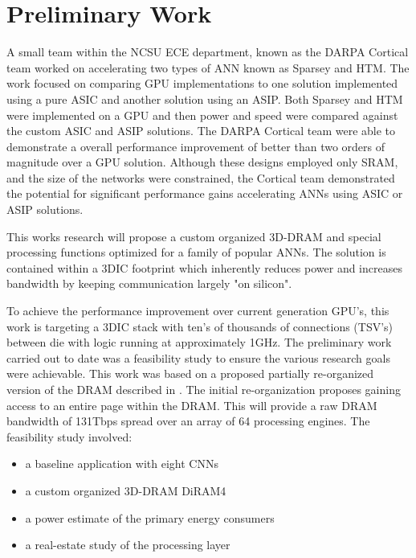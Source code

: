 
\chapter{Preliminary Work}
\label{chap-five}

A small team within the NCSU ECE department, known as the DARPA Cortical team worked on accelerating two types of ANN known as Sparsey and HTM.
The work\cite{afrl_cortical} focused on comparing GPU implementations to one solution implemented using a pure ASIC and another solution using an ASIP.
Both Sparsey and HTM were implemented on a GPU and then power and speed were compared against the custom ASIC and ASIP solutions.
The DARPA Cortical team were able to demonstrate a overall performance improvement of better than two orders of magnitude over a GPU solution.
Although these designs employed only SRAM, and the size of the networks were constrained, the Cortical team demonstrated the 
potential for significant performance gains accelerating ANNs using ASIC or ASIP solutions.

This works research will propose a custom organized 3D-DRAM and special processing functions optimized for a family of popular ANNs. 
The solution is contained within a 3DIC footprint which inherently reduces power and increases bandwidth by keeping communication largely "on silicon".

To achieve the performance improvement over current generation GPU's, this work is targeting a 3DIC stack with ten's of thousands of
connections (TSV's) between die with logic running at approximately 1GHz.
The preliminary work carried out to date was a feasibility study to ensure the various research goals were achievable.
This work was based on a proposed partially re-organized version of the DRAM described in \cite{tezzaron:diram4}.
The initial re-organization proposes gaining access to an entire page within the DRAM. This will provide a raw DRAM bandwidth of
131Tbps spread over an array of 64 processing engines. 
The feasibility study involved:
\vspace{-2mm}
\begin{itemize}
  \itemsep-0.9mm
  \item a baseline application with eight CNNs \cite{krizhevsky2012imagenetPreso}
  \item a custom organized 3D-DRAM DiRAM4 \cite{tezzaron:diram4} 
  \item a power estimate of the primary energy consumers
  \item a real-estate study of the processing layer
\end{itemize}

